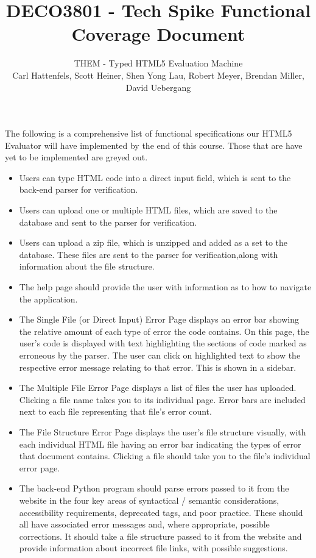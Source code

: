 \documentclass[10pt]{article}
\title{\bf \large DECO3801 - Tech Spike Functional Coverage Document}
\author{\normalsize THEM - Typed HTML5 Evaluation Machine \\ \normalsize Carl Hattenfels, Scott Heiner, Shen Yong Lau, Robert Meyer, Brendan Miller, David Uebergang}
\date{}
\begin{document}
\maketitle
The following is a comprehensive list of functional specifications our HTML5 Evaluator will have implemented by the end of this course. Those that are have yet to be implemented are greyed out.

\begin{itemize}
\item Users can type HTML code into a direct input field, which is sent to the back-end parser for verification.
\item Users can upload one or multiple HTML files, which are saved to the database and sent to the parser for verification.
\item Users can upload a zip file, which is unzipped and added as a set to the database. These files are sent to the parser for verification,along with information about the file structure.
\item The help page should provide the user with information as to how to navigate the application.
\item The Single File (or Direct Input) Error Page displays an error bar showing the relative amount of each type of error the code contains. On this page, the user's code is displayed with text highlighting the sections of code marked as erroneous by the parser.
The user can click on highlighted text to show the respective error message relating to that error. This is shown in a sidebar. %
\item The Multiple File Error Page displays a list of files the user has uploaded. Clicking a file name takes you to its individual page. Error bars are included next to each file representing that file's error count.
\item The File Structure Error Page displays the user's file structure visually, with each individual HTML file having an error bar indicating the types of error that document contains. Clicking a file should take you to the file's individual error page.
\item The back-end Python program should parse errors passed to it from the website in the four key areas of syntactical / semantic considerations, accessibility requirements, deprecated tags, and poor practice. These should all have associated error messages and, where appropriate, possible corrections. It should take a file structure passed to it from the website and provide information about incorrect file links, with possible suggestions. 
\end{itemize}
\end{document}
